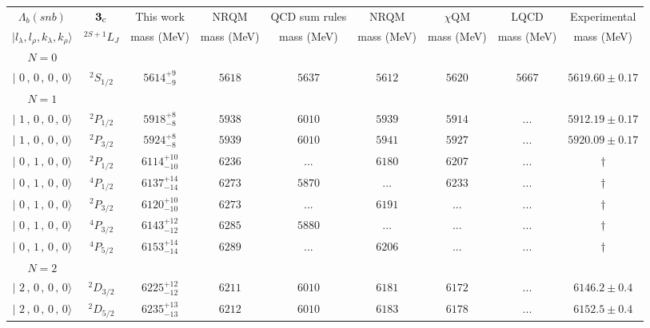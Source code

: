 \begin{tabular}{c c| c c c c c c c}\hline \hline
$\Lambda_{b}(snb)$& ${\bf {3}}_{\rm c}$& This work   &   NRQM \cite{Yoshida2015}     &  QCD sum rules \cite{Liu2008, Mao2015, Chen2016}      &  NRQM \cite{Roberts2008}    & $\chi$QM \cite{Kim2021}        & LQCD \cite{Mohanta2020}     & Experimental  \\ 
 $\vert l_{\lambda}, l_{\rho}, k_{\lambda}, k_{\rho} \rangle$ & $^{2S+1}L_{J}$ & mass (MeV)  &   mass (MeV)  &  mass (MeV)  &  mass (MeV) & mass (MeV) & mass (MeV) &      mass (MeV) \\ \hline
\hline
 $N=0$  &  &  &  &  &  \\ 
$\vert \,\,0\,,\,0\,,\,0\,,\,0 \rangle $ & $^{2}S_{1/2}$ & $5614^{+9}_{-9}$ & $5618$ & $5637$ & $5612$ & $5620$ & $5667$ & $5619.60\pm 0.17$ \\ 
\hline
 $N=1$  &  &  &  &  &  \\ 
$\vert \,\,1\,,\,0\,,\,0\,,\,0 \rangle $ & $^{2}P_{1/2}$ & $5918^{+8}_{-8}$ & $5938$ & $6010$ & $5939$ & $5914$ & ... & $5912.19\pm 0.17$ \\ 
$\vert \,\,1\,,\,0\,,\,0\,,\,0 \rangle $ & $^{2}P_{3/2}$ & $5924^{+8}_{-8}$ & $5939$ & $6010$ & $5941$ & $5927$ & ... & $5920.09\pm 0.17$ \\ 
$\vert \,\,0\,,\,1\,,\,0\,,\,0 \rangle $ & $^{2}P_{1/2}$ & $6114^{+10}_{-10}$ & $6236$ & ... & $6180$ & $6207$ & ... & $\dagger$ \\ 
$\vert \,\,0\,,\,1\,,\,0\,,\,0 \rangle $ & $^{4}P_{1/2}$ & $6137^{+14}_{-14}$ & $6273$ & $5870$ & ... & $6233$ & ... & $\dagger$ \\ 
$\vert \,\,0\,,\,1\,,\,0\,,\,0 \rangle $ & $^{2}P_{3/2}$ & $6120^{+10}_{-10}$ & $6273$ & ... & $6191$ & ... & ... & $\dagger$ \\ 
$\vert \,\,0\,,\,1\,,\,0\,,\,0 \rangle $ & $^{4}P_{3/2}$ & $6143^{+12}_{-12}$ & $6285$ & $5880$ & ... & ... & ... & $\dagger$ \\ 
$\vert \,\,0\,,\,1\,,\,0\,,\,0 \rangle $ & $^{4}P_{5/2}$ & $6153^{+14}_{-14}$ & $6289$ & ... & $6206$ & ... & ... & $\dagger$ \\ 
\hline
 $N=2$  &  &  &  &  &  \\ 
$\vert \,\,2\,,\,0\,,\,0\,,\,0 \rangle $ & $^{2}D_{3/2}$ & $6225^{+12}_{-12}$ & $6211$ & $6010$ & $6181$ & $6172$ & ... & $6146.2\pm 0.4$ \\ 
$\vert \,\,2\,,\,0\,,\,0\,,\,0 \rangle $ & $^{2}D_{5/2}$ & $6235^{+13}_{-13}$ & $6212$ & $6010$ & $6183$ & $6178$ & ... & $6152.5\pm 0.4$ \\ 

\end{tabular}
